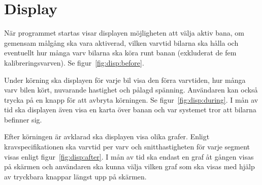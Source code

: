 \section{Display}

När programmet startas visar displayen möjligheten att välja aktiv bana, om
gemensam målgång ska vara aktiverad, vilken varvtid bilarna ska hålla och
eventuellt hur många varv bilarna ska köra runt banan (exkluderat de fem
kalibreringsvarven). Se figur~\ref{fig:disp:before}.

Under körning ska displayen för varje bil visa den förra varvtiden, hur många
varv bilen kört, nuvarande hastighet och pålagd spänning. Användaren kan också
trycka på en knapp för att avbryta körningen. Se figur~\ref{fig:disp:during}. I
mån av tid ska displayen även visa en karta över banan och var systemet tror
att bilarna befinner sig.

Efter körningen är avklarad ska displayen visa olika grafer. Enligt
kravspecifikationen ska varvtid per varv och snitthastigheten för varje segment
visas enligt figur~\ref{fig:disp:after}. I mån av tid ska endast en graf åt
gången visas på skärmen och användaren ska kunna välja vilken graf som ska
visas med hjälp av tryckbara knappar längst upp på skärmen.

